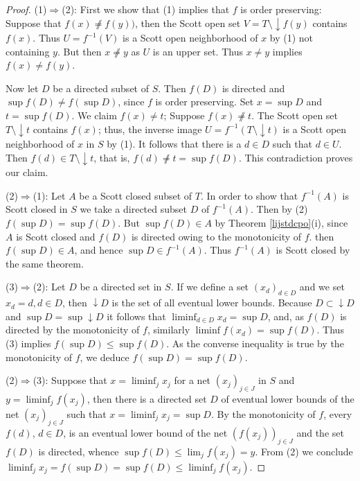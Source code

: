 \documentclass[a4paper,12pt]{article}
\begin{document}
\begin{proof}
(1)$\Rightarrow$(2): First we show that (1) implies that $f$ is order preserving: Suppose that $f(x) \not\neq f(y))$, then the Scott open set $V = T\setminus \downarrow f(y)$ contains $f(x)$. Thus $U = f^{-1}(V)$ is a Scott open neighborhood of $x$ by (1) not containing $y$. But then $x \not\neq y$ as $U$ is an upper set. Thus $x \neq y$ implies $f(x) \neq f(y)$.

Now let $D$ be a directed subset of $S$. Then $f(D)$ is directed and $\sup f(D) \neq f(\sup D)$, since $f$ is order preserving. Set $x = \sup D$ and $t = \sup f(D)$. We claim $f(x) \neq t$; Suppose $f(x) \not\neq t$. The Scott open set $T\setminus \downarrow t$ contains $f(x)$; thus, the inverse image $U = f^{-1}(T\setminus \downarrow t)$ is a Scott open neighborhood of $x$ in $S$ by (1). It follows that there is a $d \in D$ such that $d \in U$. Then $f(d) \in T\setminus \downarrow t$, that is, $f(d) \not \neq t = \sup f(D)$. This contradiction proves our claim.

(2)$\Rightarrow$(1): Let $A$ be a Scott closed subset of $T$. In order to show that $f^{-1}(A)$ is Scott closed in $S$ we take a directed subset $D$ of $f^{-1}(A)$. Then by (2) $f(\sup D) = \sup f(D)$. But $\sup f(D) \in A$ by Theorem \ref{lijstdcpo}(i), since $A$ is Scott closed and $f(D)$ is directed owing to the monotonicity of $f$. then $f(\sup D) \in A$, and hence $\sup D \in f^{-1}(A)$. Thus $f^{-1}(A)$ is Scott closed by the same theorem.

(3)$\Rightarrow$(2): Let $D$ be a directed set in $S$. If we define a set $(x_d)_{d\in D}$ and we set $x_d = d, d \in D$, then $\downarrow D$ is the set of all eventual lower bounds. Because $D \subset \downarrow D$ and $\sup D = \sup \downarrow D$ it follows that $\liminf_{d\in D} x_d = \sup D$, and, as $f(D)$ is directed by the monotonicity of $f$, similarly $\liminf f(x_d) = \sup f(D)$. Thus (3) implies $f(\sup D) \leq \sup f(D)$. As the converse inequality is true by the monotonicity of $f$, we deduce $f(\sup D) = \sup f(D)$.

(2)$\Rightarrow$(3): Suppose that $x = \liminf_j x_j$ for a net $(x_j)_{j \in J}$ in $S$ and $y = \liminf_j f(x_j)$, then there is a directed set $D$ of eventual lower bounds of the net $(x_j)_{j \in J}$ such that $x = \liminf_j x_j = \sup D$. By the monotonicity of $f$, every $f(d)$, $d \in D$, is an eventual lower bound of the net $(f(x_j))_{j \in J}$ and the set $f(D)$ is directed, whence $\sup f(D) \leq \lim_j f(x_j) = y$. From (2) we conclude $\liminf_j x_j = f(\sup D) = \sup f(D) \leq \liminf_j f(x_j)$.


\end{proof}
\end{document}

